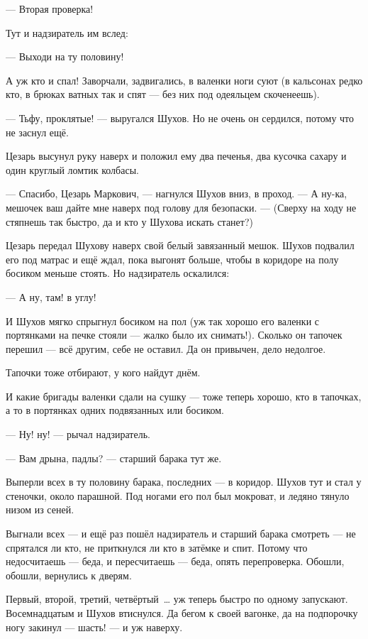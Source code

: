 --- Вторая проверка!

Тут и надзиратель им вслед:

--- Выходи на ту половину!

А уж кто и спал! Заворчали, задвигались, в валенки ноги суют (в кальсонах редко кто, в брюках 
ватных так и спят --- без них под одеяльцем скоченеешь).

--- Тьфу, проклятые! --- выругался Шухов. Но не очень он сердился, потому что не заснул ещё.

Цезарь высунул руку наверх и положил ему два печенья, два кусочка сахару и один круглый 
ломтик колбасы.

--- Спасибо, Цезарь Маркович, --- нагнулся Шухов вниз, в проход. --- А ну-ка, мешочек ваш дайте мне 
наверх под голову для безопаски. --- (Сверху на ходу не стяпнешь так быстро, да и кто у Шухова 
искать станет?)

Цезарь передал Шухову наверх свой белый завязанный мешок. Шухов подвалил его под матрас и 
ещё ждал, пока выгонят больше, чтобы в коридоре на полу босиком меньше стоять. Но надзиратель 
оскалился:

--- А ну, там! в углу!

И Шухов мягко спрыгнул босиком на пол (уж так хорошо его валенки с портянками на печке стояли 
--- жалко было их снимать!). Сколько он тапочек перешил --- всё другим, себе не оставил. Да он 
привычен, дело недолгое.

Тапочки тоже отбирают, у кого найдут днём.

И какие бригады валенки сдали на сушку --- тоже теперь хорошо, кто в тапочках, а то в портянках 
одних подвязанных или босиком.

--- Ну! ну! --- рычал надзиратель.

--- Вам дрына, падлы? --- старший барака тут же.

Выперли всех в ту половину барака, последних --- в коридор. Шухов тут и стал у стеночки, около 
парашной. Под ногами его пол был мокроват, и ледяно тянуло низом из сеней.

Выгнали всех --- и ещё раз пошёл надзиратель и старший барака смотреть --- не спрятался ли кто, 
не приткнулся ли кто в затёмке и спит. Потому что недосчитаешь --- беда, и пересчитаешь --- беда, 
опять перепроверка. Обошли, обошли, вернулись к дверям.

Первый, второй, третий, четвёртый~\dots{} уж теперь быстро по одному запускают. Восемнадцатым и 
Шухов втиснулся. Да бегом к своей вагонке, да на подпорочку ногу закинул --- шасть! --- и уж 
наверху.

